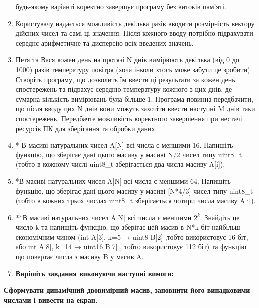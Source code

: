\documentclass[]{article}
\begin{document}
\begin{enumerate}
  будь-якому варіанті коректно завершує програму без витоків пам'яті.
\item
  Користувачу надається можливість декілька разів вводити розмірність
  вектору дійсних чисел та самі ці значення. Після кожного вводу
  потрібно підрахувати середнє арифметичне та дисперсію всіх введених
  значень.
\item
  Петя та Вася кожен день на протязі
  \protect\hypertarget{__DdeLink__55546_11145444801}{}{}N днів вимірюють
  декілька (від 0 до 1000) разів температуру повітря (хоча інколи хтось
  може забути це зробити). Створіть програму, що дозволить їм ввести ці
  результати за кожен день спостережень та підрахує середню температуру
  кожного з цих днів, де сумарна кількість вимірювань була більше 1.
  Програма повинна передбачити, що після вводу цих N днів вони можуть
  захотіти ввести наступні M днів таки спостережень. Передбачте
  можливість коректного завершення при нестачі ресурсів ПК для
  зберігання та обробки даних.
\item
  * В масиві натуральних чисел A{[}N{]} всі числа є меншими 16. Напишіть
  функцію, що зберігає дані цього масиву у масиві N/2 чисел типу
  uint8\_t (тобто в кожному числі uint8\_t зберігається два числа масиву
  A{[}i{]}).
\item
  *В масиві натуральних чисел A{[}N{]} всі числа є меншими 64. Напишіть
  функцію, що зберігає дані цього масиву у масиві {[}N*4/3{]} чисел типу
  uint8\_t (тобто в кожних трьох числах uint8\_t зберігається чотири
  числа масиву A{[}i{]}).
\item
  **В масиві натуральних чисел A{[}N{]} всі числа є меншими \(2^{k}\).
  Знайдіть це число k та напишіть функцію, що зберігає цей масив в N*k
  біт найбільш економічним чином (int A{[}3{]}, k=5 → uint8 B{[}2{]}
  ,тобто використовує 16 біт, або int A{[}8{]}, k=14 → uint16 B{[}7{]} ,
  тобто використовує 112 біт) та функцію що повертає числа з масиву B у
  масив A.
\item
  \textbf{Вирішіть завдання виконуючи наступні вимоги:}
\end{enumerate}

\textbf{Сформувати динамічний двовимірний масив, заповнити його
випадковими числами і вивести на екран. }
\end{document}
